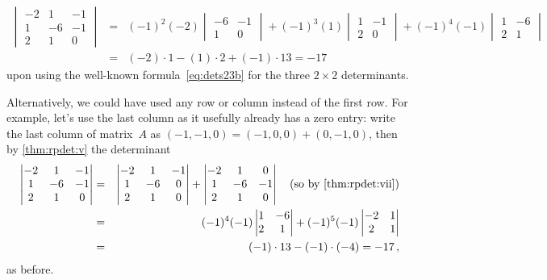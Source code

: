 \begin{example}
\begin{solution}
\begin{eqnarray*}
\begin{vmatrix}   -2&1&-1
\\   1 & -6 & -1
\\   2 &  1 & 0
\end{vmatrix}
&=&(-1)^2(-2)\begin{vmatrix}    -6 & -1
\\  1 & 0
\end{vmatrix}
+(-1)^3(1)\begin{vmatrix}    1 &  -1
\\   2 &  0
\end{vmatrix}
+(-1)^4(-1)\begin{vmatrix}   1 & -6 
\\   2 &  1 
\end{vmatrix}
\\&=&(-2)\cdot1-(1)\cdot2+(-1)\cdot13=-17
\end{eqnarray*}
upon using the well-known formula~\eqref{eq:dets23b} for the three \(2\times 2\) determinants.

Alternatively, we could have used any row or column instead of the first row.  
For example, let's use the last column as it usefully already has a zero entry: write the last column of matrix~\(A\) as \((-1,-1,0)=(-1,0,0)+(0,-1,0)\), then by \cref{thm:rpdet:v} the determinant
\begin{eqnarray*}
\begin{vmatrix}   -2&1&-1
\\   1 & -6 & -1
\\   2 &  1 & 0
\end{vmatrix}
&=&\begin{vmatrix}   -2&1&-1
\\   1 & -6 & 0
\\   2 &  1 & 0
\end{vmatrix}
+\begin{vmatrix}   -2&1&0
\\   1 & -6 & -1
\\   2 &  1 & 0
\end{vmatrix}
\quad(\text{so by \cref{thm:rpdet:vii}})
\\&=&(-1)^4(-1)\begin{vmatrix}
  1 & -6 
\\   2 &  1 
\end{vmatrix}
+(-1)^5(-1)\begin{vmatrix}   -2&1
\\   2 &  1 
\end{vmatrix}
\\&=&(-1)\cdot 13-(-1)\cdot(-4)=-17\,,
\end{eqnarray*}
as before.
\end{solution}
\end{example}






